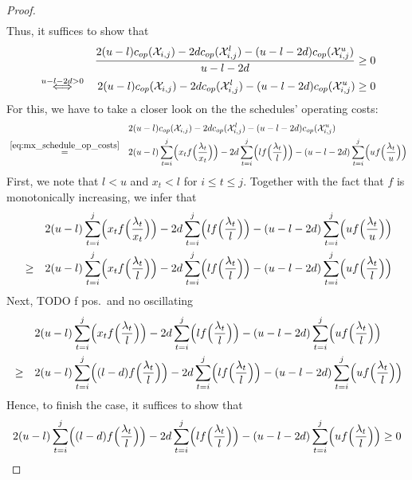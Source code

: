 \begin{proof}
\begin{align*}
\end{align*}
Thus, it suffices to show that
\begin{align*}
	&&\frac{2(u-l)c_{op}(\mathcal{X}_{i,j})-2dc_{op}(\mathcal{X}_{i,j}^l)-(u-l-2d)c_{op}(\mathcal{X}_{i,j}^u)}{u-l-2d}&\ge 0\\
	&\stackrel{u-l-2d>0}{\iff}&2(u-l)c_{op}(\mathcal{X}_{i,j})-2dc_{op}(\mathcal{X}_{i,j}^l)-(u-l-2d)c_{op}(\mathcal{X}_{i,j}^u)&\ge 0
\end{align*}
For this, we have to take a closer look on the the schedules' operating costs:
\begin{align*}
	&&&2(u-l)c_{op}(\mathcal{X}_{i,j})-2dc_{op}(\mathcal{X}_{i,j}^l)-(u-l-2d)c_{op}(\mathcal{X}_{i,j}^u)\\
	&\stackrel{\eqref{eq:mx_schedule_op_costs}}{=}&&2(u-l)\sum\limits_{t=i}^j\Bigl(x_tf\Bigl(\frac{\lambda_t}{x_t}\Bigr)\Bigr)-2d\sum\limits_{t=i}^j\Bigl(lf\Bigl(\frac{\lambda_t}{l}\Bigr)\Bigr)-(u-l-2d)\sum\limits_{t=i}^j\Bigl(uf\Bigl(\frac{\lambda_t}{u}\Bigr)\Bigr)
\end{align*}
First, we note that $l<u$ and $x_t<l$ for $i\le t\le j$. Together with the fact that $f$ is monotonically increasing, we infer that
\begin{align*}
	&&&2(u-l)\sum\limits_{t=i}^j\Bigl(x_tf\Bigl(\frac{\lambda_t}{x_t}\Bigr)\Bigr)-2d\sum\limits_{t=i}^j\Bigl(lf\Bigl(\frac{\lambda_t}{l}\Bigr)\Bigr)-(u-l-2d)\sum\limits_{t=i}^j\Bigl(uf\Bigl(\frac{\lambda_t}{u}\Bigr)\Bigr)\\
	&\ge&&2(u-l)\sum\limits_{t=i}^j\Bigl(x_tf\Bigl(\frac{\lambda_t}{l}\Bigr)\Bigr)-2d\sum\limits_{t=i}^j\Bigl(lf\Bigl(\frac{\lambda_t}{l}\Bigr)\Bigr)-(u-l-2d)\sum\limits_{t=i}^j\Bigl(uf\Bigl(\frac{\lambda_t}{l}\Bigr)\Bigr)
\end{align*}
Next, TODO f pos.\ and no oscillating
\begin{align*}
	&&&2(u-l)\sum\limits_{t=i}^j\Bigl(x_tf\Bigl(\frac{\lambda_t}{l}\Bigr)\Bigr)-2d\sum\limits_{t=i}^j\Bigl(lf\Bigl(\frac{\lambda_t}{l}\Bigr)\Bigr)-(u-l-2d)\sum\limits_{t=i}^j\Bigl(uf\Bigl(\frac{\lambda_t}{l}\Bigr)\Bigr)\\
	&\ge&&2(u-l)\sum\limits_{t=i}^j\Bigl((l-d)f\Bigl(\frac{\lambda_t}{l}\Bigr)\Bigr)-2d\sum\limits_{t=i}^j\Bigl(lf\Bigl(\frac{\lambda_t}{l}\Bigr)\Bigr)-(u-l-2d)\sum\limits_{t=i}^j\Bigl(uf\Bigl(\frac{\lambda_t}{l}\Bigr)\Bigr)
\end{align*}
Hence, to finish the case, it suffices to show that
\begin{align*}
	2(u-l)\sum\limits_{t=i}^j\Bigl((l-d)f\Bigl(\frac{\lambda_t}{l}\Bigr)\Bigr)-2d\sum\limits_{t=i}^j\Bigl(lf\Bigl(\frac{\lambda_t}{l}\Bigr)\Bigr)-(u-l-2d)\sum\limits_{t=i}^j\Bigl(uf\Bigl(\frac{\lambda_t}{l}\Bigr)\Bigr)\ge 0

\end{align*}
\end{proof}
